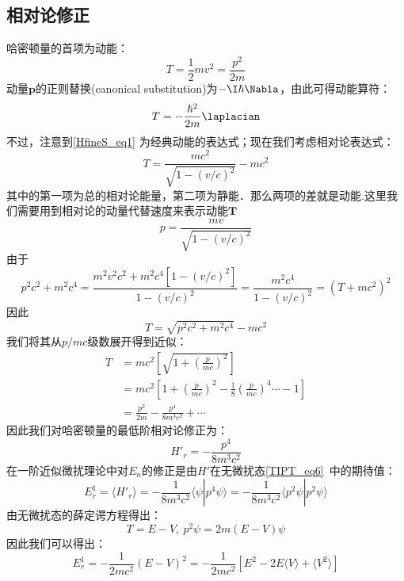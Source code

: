\subsection{相对论修正}
哈密顿量的首项为动能：
\begin{equation}\label{HfineS_eq1}
T=\frac{1}{2}mv^2=\frac{p^2}{2m}
\end{equation}
动量$\mathbf p$的正则替换(canonical substitution)为$-\I\hbar\Nabla$，由此可得动能算符：
\begin{equation}
T=-\frac{\hbar^2}{2m}\laplacian
\end{equation}
不过，注意到\autoref{HfineS_eq1} 为经典动能的表达式；现在我们考虑相对论表达式：
\begin{equation}
T=\frac{mc^2}{\sqrt{1-(v/c)^2}}-mc^2
\end{equation}
其中的第一项为总的相对论能量，第二项为静能．那么两项的差就是动能.这里我们需要用到相对论的动量代替速度来表示动能$\mathbf T$
\begin{equation}
p=\frac{mv}{\sqrt{1-(v/c)^2}}
\end{equation}
由于
\begin{equation}
p^2c^2+m^2c^4=\frac{m^2v^2c^2+m^2c^4[1-(v/c)^2]}{1-(v/c)^2}=\frac{m^2c^4}{1-(v/c)^2}=(T+mc^2)^2
\end{equation}
因此
\begin{equation}
T=\sqrt{p^2c^2+m^2c^4}-mc^2
\end{equation}
我们将其从$p/mc$级数展开得到近似：
\begin{align}
T &= mc^2\left[\sqrt{1+\left(\frac{p}{mc}\right)^2}\right]\\ 
&=mc^2\left[1+\left(\frac{p}{mc}\right)^2-\frac{1}{8}\left(\frac{p}{mc}\right)^4\cdots -1\right]\\
&=\frac{p^2}{2m}-\frac{p^4}{8m^3c^2}+\cdots
\end{align}
因此我们对哈密顿量的最低阶相对论修正为：
\begin{equation}
H'_r=-\frac{p^4}{8m^3c^2}
\end{equation}
在一阶近似微扰理论中对$E_n$的修正是由$H'$在无微扰态\autoref{TIPT_eq6}~中的期待值：
\begin{equation}
E_r^1=\langle H'_r\rangle=-\frac{1}{8m^3c^2}\langle\psi|p^4\psi\rangle=-\frac{1}{8m^3c^2}\langle p^2\psi|p^2\psi\rangle
\end{equation}
由无微扰态的薛定谔方程得出：
\begin{equation}
T=E-V, \ p^2\psi = 2m(E-V)\psi
\end{equation}
因此我们可以得出：
\begin{equation}
E_r^1=-\frac{1}{2mc^2}(E-V)^2=-\frac{1}{2mc^2}[E^2-2E\langle V\rangle+\langle V^2\rangle]
\end{equation}
